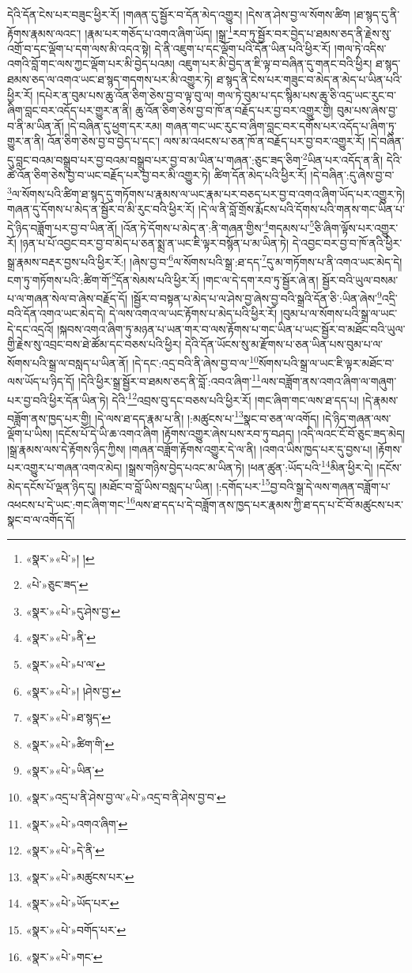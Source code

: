 དེའི་དོན་ངེས་པར་བཟུང་ཕྱིར་རོ། །གཞན་དུ་སྦྱོར་བ་དོན་མེད་འགྱུར། །དེས་ན་ཤེས་བྱ་ལ་སོགས་ཚིག །ཐ་སྙད་དུ་ནི་རྟོགས་རྣམས་ལའང་། །རྣམ་པར་གཅོད་པ་འགའ་ཞིག་ཡོད། །སྒྲ་\footnote{«སྣར་»«པེ་»། །}རབ་ཏུ་སྦྱོར་བར་བྱེད་པ་ཐམས་ཅད་ནི་རྗེས་སུ་འགྲོ་བ་དང་ལྡོག་པ་དག་ལས་མི་འདའ་སྟེ། དེ་ནི་འཇུག་པ་དང་ལྡོག་པའི་དོན་ཡིན་པའི་ཕྱིར་རོ། །གལ་ཏེ་འདིས་འགའི་བློ་གང་ལས་ཀྱང་ལྡོག་པར་མི་བྱེད་པའམ། འཇུག་པར་མི་བྱེད་ན་ཇི་ལྟ་བ་བཞིན་དུ་གནང་བའི་ཕྱིར། ཐ་སྙད་ཐམས་ཅད་ལ་འགའ་ཡང་ཐ་སྙད་གདགས་པར་མི་འགྱུར་ཏེ། ཐ་སྙད་ནི་ངེས་པར་གཟུང་བ་མེད་ན་མེད་པ་ཡིན་པའི་ཕྱིར་རོ། །དཔེར་ན་བུམ་པས་ཆུ་འོན་ཅིག་ཅེས་བྱ་བ་ལྟ་བུ་ལ། གལ་ཏེ་བུམ་པ་དང་སྙིམ་པས་ཆུ་ཅི་འདྲ་ཡང་རུང་བ་ཞིག་བླང་བར་འདོད་པར་གྱུར་ན་ནི། ཆུ་འོན་ཅིག་ཅེས་བྱ་བ་ཁོ་ན་བརྗོད་པར་བྱ་བར་འགྱུར་གྱི། བུམ་པས་ཞེས་བྱ་བ་ནི་མ་ཡིན་ནོ། །དེ་བཞིན་དུ་ཕྱག་དར་རམ། གཞན་གང་ཡང་རུང་བ་ཞིག་བླང་བར་དགོས་པར་འདོད་པ་ཞིག་ཏུ་གྱུར་ན་ནི། འོན་ཅིག་ཅེས་བྱ་བ་བྱེད་པ་དང་། ལས་མ་འཕངས་པ་ཅན་ཁོ་ན་བརྗོད་པར་བྱ་བར་འགྱུར་རོ། །དེ་བཞིན་དུ་བླང་བའམ་བསྒྲུབ་པར་བྱ་བའམ་བསྒྲུབ་པར་བྱ་བ་མ་ཡིན་པ་གཞན་:ཅུང་ཟད་ཅིག་\footnote{«པེ་»ཅུང་ཟད་}ཡིན་པར་འདོད་ན་ནི། དེའི་ཚེ་འོན་ཅིག་ཅེས་བྱ་བ་ཡང་བརྗོད་པར་བྱ་བར་མི་འགྱུར་ཏེ། ཚིག་དོན་མེད་པའི་ཕྱིར་རོ། །དེ་བཞིན་:དུ་ཞེས་བྱ་བ་\footnote{«སྣར་»«པེ་»དུ་ཤེས་བྱ་}ལ་སོགས་པའི་ཚིག་ཐ་སྙད་དུ་གཏོགས་པ་རྣམས་ལ་ཡང་རྣམ་པར་བཅད་པར་བྱ་བ་འགའ་ཞིག་ཡོད་པར་འགྱུར་ཏེ། གཞན་དུ་དོགས་པ་མེད་ན་སྦྱོར་བ་མི་རུང་བའི་ཕྱིར་རོ། །དེ་ལ་ནི་བློ་གྲོས་རྨོངས་པའི་དོགས་པའི་གནས་གང་ཡིན་པ་དེ་ཉིད་བཟློག་པར་བྱ་བ་ཡིན་ནོ། །འོན་ཏེ་དོགས་པ་མེད་ན་:ནི་གཞན་གྱིས་\footnote{«སྣར་»«པེ་»ནི་}གདམས་པ་\footnote{«སྣར་»«པེ་»པ་ལ་}ཅི་ཞིག་ལྟོས་པར་འགྱུར་རོ། །ཉན་པ་པོ་འབྱང་བར་བྱ་བ་མེད་པ་ཅན་སྨྲ་ན་ཡང་ཇི་ལྟར་བསྙོན་པ་མ་ཡིན་ཏེ། དེ་འབྱང་བར་བྱ་བ་ཁོ་ནའི་ཕྱིར་སྒྲ་རྣམས་བརྡར་བྱས་པའི་ཕྱིར་རོ:། །ཞེས་བྱ་བ་\footnote{«སྣར་»«པེ་»། །ཤེས་བྱ་}ལ་སོགས་པའི་སྒྲ་:ཐ་དད་\footnote{«སྣར་»«པེ་»ཐ་སྙད་}དུ་མ་གཏོགས་པ་ནི་འགའ་ཡང་མེད་དེ། ངག་ཏུ་གཏོགས་པའི་:ཚིག་གོ་\footnote{«སྣར་»«པེ་»ཚིག་གི་}དོན་སེམས་པའི་ཕྱིར་རོ། །གང་ལ་དེ་དག་རབ་ཏུ་སྦྱོར་ཞེ་ན། སྦྱོར་བའི་ཡུལ་བསམ་པ་ལ་གཞན་སེལ་བ་ཞེས་བརྗོད་དོ། །སྦྱོར་བ་བསྟན་པ་མེད་པ་ལ་ཤེས་བྱ་ཞེས་བྱ་བའི་སྒྲའི་དོན་ཅི་:ཡིན་ཞེས་\footnote{«སྣར་»«པེ་»ཡིན་}འདྲི་བའི་དོན་འགའ་ཡང་མེད་དེ། དེ་ལས་འགའ་ལ་ཡང་རྟོགས་པ་མེད་པའི་ཕྱིར་རོ། །བུམ་པ་ལ་སོགས་པའི་སྒྲ་ལ་ཡང་དེ་དང་འདྲའོ། །སྐབས་འགའ་ཞིག་ཏུ་མཉན་པ་ཡན་གར་བ་ལས་རྟོགས་པ་གང་ཡིན་པ་ཡང་སྦྱོར་བ་མཐོང་བའི་ཡུལ་གྱི་རྗེས་སུ་འབྲང་བས་ཐེ་ཚོམ་དང་བཅས་པའི་ཕྱིར། དེའི་དོན་ཡོངས་སུ་མ་རྫོགས་པ་ཅན་ཡིན་པས་བུམ་པ་ལ་སོགས་པའི་སྒྲ་ལ་བསླད་པ་ཡིན་ནོ། །དེ་དང་:འདྲ་བའི་ནི་ཞེས་བྱ་བ་ལ་\footnote{«སྣར་»འདྲ་པ་ནི་ཤེས་བྱ་ལ་«པེ་»འདྲ་བ་ནི་ཤེས་བྱ་བ་}སོགས་པའི་སྒྲ་ལ་ཡང་ཇི་ལྟར་མཐོང་བ་ལས་ཡོད་པ་ཉིད་དོ། །དེའི་ཕྱིར་སྒྲ་སྦྱོར་བ་ཐམས་ཅད་ནི་བློ་:འབའ་ཞིག་\footnote{«སྣར་»«པེ་»འགའ་ཞིག་}ལས་བཟློག་ནས་འགའ་ཞིག་ལ་གཞུག་པར་བྱ་བའི་ཕྱིར་དོན་ཡིན་ཏེ། དེའི་\footnote{«སྣར་»«པེ་»དེ་ནི་}འབྲས་བུ་དང་བཅས་པའི་ཕྱིར་རོ། །གང་ཞིག་གང་ལས་ཐ་དད་པ། །དེ་རྣམས་བཟློག་ནས་ཁྱད་པར་གྱི། །དེ་ལས་ཐ་དད་རྣམ་པ་ནི། །:མཚུངས་པ་\footnote{«སྣར་»«པེ་»མཚུངས་པར་}སྣང་བ་ཅན་ལ་འགོད། །དེ་ཉིད་གཞན་ལས་ལྡོག་པ་ཡིས། །དངོས་པོ་དེ་ཡི་ཆ་འགའ་ཞིག །རྟོགས་འགྱུར་ཞེས་པས་རབ་ཏུ་བཤད། །འདི་ལའང་ངོ་བོ་ཅུང་ཟད་མེད། །སྒྲ་རྣམས་ལས་དེ་རྟོགས་ཉིད་ཀྱིས། །གཞན་བཟློག་རྟོགས་འགྱུར་དེ་ལ་ནི། །འགའ་ཡིས་ཁྱད་པར་དུ་བྱས་པ། །རྟོགས་པར་འགྱུར་པ་གཞན་འགའ་མེད། །སྒྲས་གཉིས་བྱེད་པའང་མ་ཡིན་ཏེ། །ཕན་ཚུན་:ཡོད་པའི་\footnote{«སྣར་»«པེ་»ཡོད་པར་}མིན་ཕྱིར་དེ། །དངོས་མེད་དངོས་པོ་ལྡན་ཉིད་དུ། །མཐོང་བ་བློ་ཡིས་བསླད་པ་ཡིན། །:དགོད་པར་\footnote{«སྣར་»«པེ་»བགོད་པར་}བྱ་བའི་སྒྲ་དེ་ལས་གཞན་བཟློག་པ་འཕངས་པ་དེ་ཡང་:གང་ཞིག་གང་\footnote{«སྣར་»«པེ་»གང་}ལས་ཐ་དད་པ་དེ་བཟློག་ནས་ཁྱད་པར་རྣམས་ཀྱི་ཐ་དད་པ་ངོ་བོ་མཚུངས་པར་སྣང་བ་ལ་འགོད་དོ། 